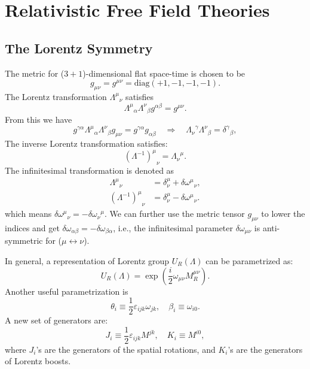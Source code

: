 \chapter{Relativistic Free Field Theories}

\section{The Lorentz Symmetry}

The metric for ($3+1$)-dimensional flat space-time is chosen to be
\begin{equation}
	g_{\mu\nu}=g^{\mu\nu}=\mathrm{diag}(+1,-1,-1,-1).
\end{equation}
The Lorentz transformation ${\Lambda^{\mu}}_{\nu}$ satisfies
\begin{equation}
{\Lambda^{\mu}}_{\alpha}{\Lambda^{\nu}}_{\beta} g^{\alpha\beta} = g^{\mu\nu}.
\end{equation}
From this we have
\begin{equation}
	g^{\gamma\alpha}{\Lambda^{\mu}}_{\alpha}{\Lambda^{\nu}}_{\beta} g_{\mu\nu} 
	= g^{\gamma\alpha}g_{\alpha\beta} 
	\quad \Longrightarrow \quad
	{\Lambda_{\nu}}^{\gamma}{\Lambda^{\nu}}_{\beta} 
	= {\delta^{\gamma}}_{\beta},
\end{equation}
The inverse Lorentz transformation satisfies:
\begin{equation}
	{(\Lambda^{-1})^{\mu}}_{\nu} = {\Lambda_{\nu}}^{\mu}.
\end{equation}
The infinitesimal transformation is denoted as
\begin{equation}
\begin{aligned}
	{\Lambda^{\mu}}_{\nu} &= \delta^{\mu}_{\nu}+\delta{\omega^{\mu}}_{\nu}, \\
	{(\Lambda^{-1})^\mu}_\nu &= \delta^{\mu}_{\nu}-\delta{\omega^\mu}_\nu.
\end{aligned}
\end{equation}
which means $\delta {\omega^\mu}_\nu = -\delta {\omega_\nu}^\mu$.
We can further use the metric tensor $g_{\mu\nu}$ to lower the indices and get $\delta\omega_{\alpha\beta} = -\delta\omega_{\beta\alpha}$, i.e., the infinitesimal parameter $\delta \omega_{\mu\nu}$ is anti-symmetric for ($\mu \leftrightarrow \nu$).

In general, a representation of Lorentz group $U_R(\Lambda)$ can be parametrized as:
\begin{equation}
	U_R(\Lambda) = \exp\left(\frac{i}{2}\omega_{\mu\nu}M_R^{\mu\nu}\right).
\end{equation}
Another useful parametrization is
\begin{equation}
	\theta_i \equiv \frac{1}{2}\varepsilon_{ijk}\omega_{jk}, \quad 
	\beta_i \equiv \omega_{i0}.
\end{equation}
A new set of generators are:
\begin{equation}
	J_i \equiv \frac{1}{2}\varepsilon_{ijk}M^{jk}, \quad 
	K_i \equiv M^{i0},
\end{equation}
where $J_i$'s are the generators of the spatial rotations, and $K_i$'s are the generators of Lorentz boosts.

